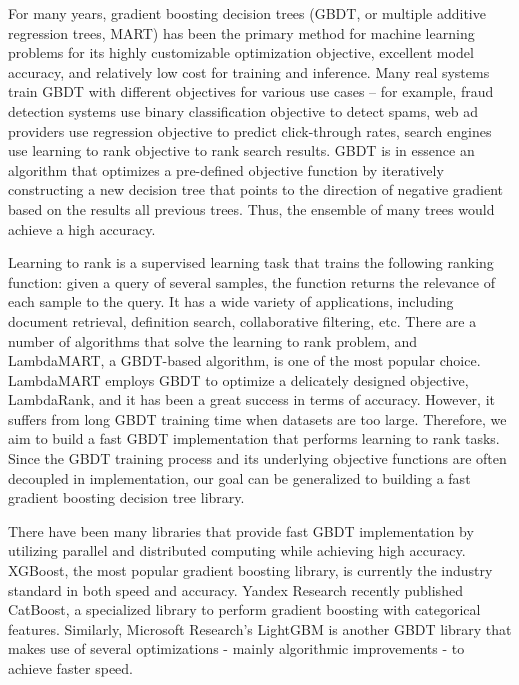 For many years, gradient boosting decision trees (GBDT, or multiple additive regression trees, MART) has been the primary method for machine learning problems for its highly customizable optimization objective, excellent model accuracy, and relatively low cost for training and inference.
Many real systems train GBDT with different objectives for various use cases -- for example, fraud detection systems use binary classification objective to detect spams, web ad providers use regression objective to predict click-through rates, search engines use learning to rank objective to rank search results. 
GBDT is in essence an algorithm that optimizes a pre-defined objective function by iteratively constructing a new decision tree that points to the direction of negative gradient based on the results all previous trees. Thus, the ensemble of many trees would achieve a high accuracy.

Learning to rank\cite{ltr2009} is a supervised learning task that trains the following ranking function: given a query of several samples, the function returns the relevance of each sample to the query. It has a wide variety of applications, including document retrieval, definition search, collaborative filtering, etc. There are a number of algorithms that solve the learning to rank problem, and LambdaMART\cite{lambdamart2010}, a GBDT-based algorithm, is one of the most popular choice. LambdaMART employs GBDT to optimize a delicately designed objective, LambdaRank\cite{lambdamart2010}, and it has been a great success in terms of accuracy. However, it suffers from long GBDT training time when datasets are too large. Therefore, we aim to build a fast GBDT implementation that performs learning to rank tasks. Since the GBDT training process and its underlying objective functions are often decoupled in implementation, our goal can be generalized to building a fast gradient boosting decision tree library.

There have been many libraries that provide fast GBDT implementation by utilizing parallel and distributed computing while achieving high accuracy. XGBoost\cite{xgboost2016}, the most popular gradient boosting library, is currently the industry standard in both speed and accuracy. Yandex Research recently published CatBoost\cite{catboost2018}, a specialized library to perform gradient boosting with categorical features. Similarly, Microsoft Research's LightGBM\cite{lightgbm2017} is another GBDT library that makes use of several optimizations - mainly algorithmic improvements - to achieve faster speed.

